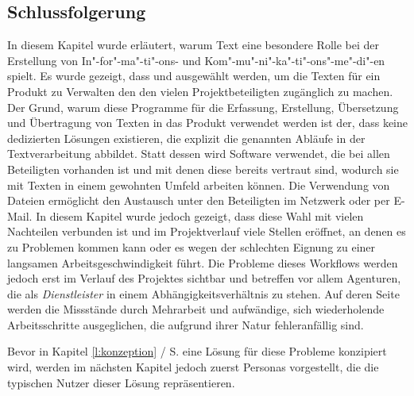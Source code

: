 \subsection{Schlussfolgerung}\label{l:schlussfolgerung}

In diesem Kapitel wurde erläutert, warum Text eine besondere Rolle bei der Erstellung von In"-for"-ma"-ti"-ons- und Kom"-mu"-ni"-ka"-ti"-ons"-me"-di"-en spielt. Es wurde gezeigt, dass  und  ausgewählt werden, um die Texten für ein Produkt zu Verwalten den den vielen Projektbeteiligten zugänglich zu machen. Der Grund, warum diese Programme für die Erfassung, Erstellung, Übersetzung und Übertragung von Texten in das Produkt verwendet werden ist der, dass keine  dedizierten Lösungen existieren, die explizit die genannten Abläufe in der Textverarbeitung abbildet. Statt dessen wird Software verwendet, die bei allen Beteiligten vorhanden ist und mit denen diese bereits vertraut sind, wodurch sie mit Texten in einem gewohnten Umfeld arbeiten können. Die Verwendung von Dateien ermöglicht den Austausch unter den Beteiligten im Netzwerk oder per E-Mail. In diesem Kapitel wurde jedoch gezeigt, dass diese Wahl mit vielen Nachteilen verbunden ist und im Projektverlauf viele Stellen eröffnet, an denen es zu Problemen kommen kann oder es wegen der schlechten Eignung zu einer langsamen Arbeitsgeschwindigkeit führt. Die Probleme dieses Workflows werden jedoch erst im Verlauf des Projektes sichtbar und betreffen vor allem Agenturen, die als \emph{Dienstleister} in einem Abhängigkeitsverhältnis zu stehen. Auf deren Seite werden die Missstände durch Mehrarbeit und aufwändige, sich wiederholende Arbeitsschritte ausgeglichen, die aufgrund ihrer Natur fehleranfällig sind.

\bigskip

Bevor in Kapitel \ref{l:konzeption} / S.\pageref{l:konzeption} eine Lösung für diese Probleme konzipiert wird, werden im nächsten Kapitel jedoch zuerst Personas vorgestellt, die die typischen Nutzer dieser Lösung repräsentieren.

\pagebreak